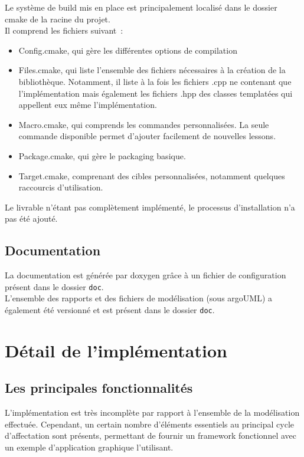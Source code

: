 Le système de build mis en place est principalement localisé dans le dossier cmake de la racine du projet.\\

Il comprend les fichiers suivant~:
\begin{itemize}
\item Config.cmake, qui gère les différentes options de compilation
\item Files.cmake, qui liste l'ensemble des fichiers nécessaires à la création de la bibliothèque. Notamment, il liste à la fois les fichiers .cpp ne contenant que l'implémentation mais également les fichiers .hpp des classes templatées qui appellent eux même l'implémentation.
\item Macro.cmake, qui comprends les commandes personnalisées. La seule commande disponible permet d'ajouter facilement de nouvelles lessons.
\item Package.cmake, qui gère le packaging basique.
\item Target.cmake, comprenant des cibles personnalisées, notamment quelques raccourcis d'utilisation.\\
\end{itemize}

Le livrable n'étant pas complètement implémenté, le processus d'installation n'a pas été ajouté.

\subsection{Documentation}
La documentation est générée par doxygen grâce à un fichier de configuration présent dans le dossier \texttt{doc}.\\

L'ensemble des rapports et des fichiers de modélisation (sous argoUML) a également été versionné et est présent dans le dossier \texttt{doc}.

\section{Détail de l'implémentation}
\subsection{Les principales fonctionnalités}
L'implémentation est très incomplète par rapport à l'ensemble de la modélisation effectuée. Cependant, un certain nombre d'éléments essentiels au principal cycle d'affectation sont présents, permettant de fournir un framework fonctionnel avec un exemple d'application graphique l'utilisant.

